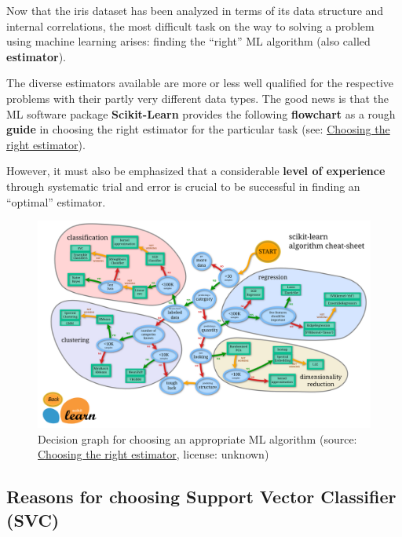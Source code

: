 \documentclass [oneside,10pt,a4paper,ngerman,BCOR10mm,headsepline,parindent,final]{scrartcl}
\begin{document}
Now that the iris dataset has been analyzed in terms of its data
structure and internal correlations, the most difficult task on the way
to solving a problem using machine learning arises: finding the
``right'' ML algorithm (also called \textbf{estimator}).

The diverse estimators available are more or less well qualified for the
respective problems with their partly very different data types. The
good news is that the ML software package \textbf{Scikit-Learn} provides
the following \textbf{flowchart} as a rough \textbf{guide} in choosing
the right estimator for the particular task (see:
\href{https://scikit-learn.org/stable/tutorial/machine_learning_map/index.html}{Choosing
the right estimator}).

However, it must also be emphasized that a considerable \textbf{level of
experience} through systematic trial and error is crucial to be
successful in finding an ``optimal'' estimator.

    \begin{figure}
\centering
\includegraphics{images/scikit-learn_ml_algorithm_decision.png}
\caption{Decision graph for choosing an appropriate ML algorithm
(source:
\href{https://scikit-learn.org/stable/tutorial/machine_learning_map/index.html}{Choosing
the right estimator}, license: unknown)}
\end{figure}

    \hypertarget{reasons-for-choosing-support-vector-classifier-svc}{%
\subsection{Reasons for choosing Support Vector Classifier
(SVC)}\label{reasons-for-choosing-support-vector-classifier-svc}}
\end{document}
